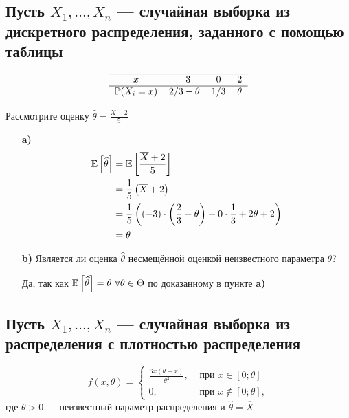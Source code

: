 \documentclass{article}
\begin{document}
\subsection{Пусть $X_1,\ldots, X_n$ — случайная выборка из дискретного распределения, заданного с помощью таблицы}
\begin{equation*}
    \begin{tabular}{cccc}
        \hline
        $x$ & $-3$ & $0$ & $2$\\
        \hline
        $\mathbb{P}(X_i=x)$ & $2/3-\theta$ & 1/3 & $\theta$\\
        \hline
    \end{tabular}
\end{equation*}

Рассмотрите оценку $\widehat{\theta}=\displaystyle\frac{\overline{X}+2}{5}$
\begin{itemize}
    \item[\textbf{a)}] \begin{equation*}
        \begin{aligned}
            \mathbb{E}\left[\widehat{\theta}\right]&=\mathbb{E}\left[\frac{\overline{X}+2}{5}\right]\\
            &=\frac{1}{5}\left(\overline{X}+2\right)\\
            &=\frac{1}{5}\left((-3)\cdot\left(\frac{2}{3}-\theta\right)+0\cdot\frac{1}{3}+2\theta+2\right)\\
            &=\theta
        \end{aligned}
    \end{equation*}

    \item[\textbf{b)}] Является ли оценка $\widehat{\theta}$ несмещённой оценкой неизвестного параметра $\theta$?
    
    Да, так как $\matwait{\widehat{\theta}}=\theta\ \forall\theta\in\Theta$ по доказанному в пункте \textbf{a)}
\end{itemize}

\subsection{Пусть $X_1,\ldots, X_n$ — случайная выборка из распределения с плотностью распределения}
\begin{equation*}
    f(x,\theta)=\begin{cases}
        \frac{6x(\theta-x)}{\theta^3},&\text{ при }x\in[0;\theta]\\
        0,&\text{ при }x\notin[0;\theta],
    \end{cases}
\end{equation*}
где $\theta>0$ — неизвестный параметр распределения и $\hat{\theta}=\overline{X}$
\end{document}
